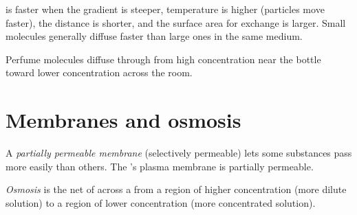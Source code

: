 \begin{proposition}\label{prop:g8:diffusion:rate}
 is faster when the gradient is steeper, temperature is higher
(particles move faster), the distance is shorter, and the surface area for
exchange is larger. Small molecules generally diffuse faster than large
ones in the same medium.
\end{proposition}
\admitted

\begin{example}\label{ex:g8:diffusion:perfume}
Perfume molecules diffuse through  from high concentration near the
bottle toward lower concentration across the room.
\end{example}

\section{Membranes and osmosis}

\begin{definition}\label{def:g8:diffusion:membrane}
A \emph{partially permeable membrane}
(selectively permeable) lets some substances pass more easily than others.
The 's plasma membrane is partially permeable.
\end{definition}

\begin{definition}[Osmosis]\label{def:g8:diffusion:osmosis}
\emph{Osmosis} is the net  of \emph{} across
a  from a region of higher  concentration
(more dilute solution) to a region of lower  concentration (more
concentrated solution).
\end{definition}

